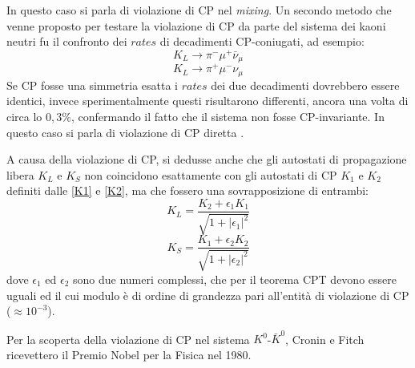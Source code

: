 In questo caso si parla di violazione di CP nel \emph{mixing}.
Un secondo metodo che venne proposto per testare la violazione di CP da parte del sistema dei kaoni neutri fu il confronto dei $rates$ di decadimenti
CP-coniugati, ad esempio:
\begin{equation}
 K_L \longrightarrow \pi^- \mu^+ \bar{\nu}_{\mu}
\end{equation}
\begin{equation}
 K_L \longrightarrow \pi^+ \mu^- \nu_{\mu}
\end{equation}
Se CP fosse una simmetria esatta i $rates$ dei due decadimenti dovrebbero essere identici, invece sperimentalmente questi risultarono differenti, 
ancora una volta di circa lo $0,3\%$, confermando il fatto che il sistema non fosse CP-invariante. In questo caso si parla di violazione di CP diretta \cite{Wong}.

A causa della violazione di CP, si dedusse anche che gli autostati di propagazione libera $K_L$ e $K_S$ non coincidono esattamente con gli autostati di CP $K_1$ e 
$K_2$ definiti dalle \eqref{K1} e \eqref{K2}, ma che fossero una sovrapposizione di entrambi:
\begin{equation}
    K_L = \frac{K_2 + \epsilon_1 K_1}{\sqrt{1+|\epsilon_1|^2}}  
\end{equation}
\begin{equation}
    K_S = \frac{K_1 + \epsilon_2 K_2}{\sqrt{1+|\epsilon_2|^2}}  
\end{equation}
dove $\epsilon_1$ ed $\epsilon_2$ sono due numeri complessi, che per il teorema CPT devono essere uguali ed il cui modulo è di ordine di grandezza pari all'entità di
violazione di CP ($\approx 10^{-3}$). \cite{Lee}

Per la scoperta della violazione di CP nel sistema $K^0$-$\bar{K}^0$, Cronin e Fitch ricevettero il Premio Nobel per la Fisica nel 1980.
